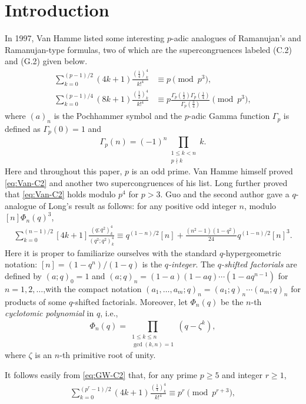\documentclass[12pt]{article}
\numberwithin{equation}{section}
\begin{document}
\section{Introduction}
In 1997, Van Hamme\cite{Van} listed some interesting $p$-adic analogues of Ramanujan's and Ramanujan-type formulas, two of which are the supercongruences 
labeled {\rm (C.2)} and {\rm (G.2)} given below. 
\begin{align}
    \label{eq:Van-C2}\sum_{k=0}^{(p-1)/2}(4k+1)\frac{(\tfrac14)^4_k}{k!^4}&\equiv p\pmod{p^3},\\
    \label{eq:Van-G2}\sum_{k=0}^{(p-1)/4}(8k+1)\frac{(\tfrac12)^4_k}{k!^4}&\equiv p\frac{\Gamma_p(\tfrac12)\Gamma_p(\tfrac14)}{\Gamma_p(\tfrac34)}\pmod{p^3},
\end{align}
where $(a)_n$ is the Pochhammer symbol and the $p$-adic Gamma function $\Gamma_p$ is defined as
$\Gamma_p(0)=1$ and \[\Gamma_p(n)=(-1)^n\prod_{\substack{1\leqslant k < n\\ p\nmid k}}^{}k.\] Here and throughout this paper, $p$ is an odd prime.
Van Hamme\cite{Van} himself proved \eqref{eq:Van-C2} and another two supercongruences of his list.  
Long\cite{Long} further proved that \eqref{eq:Van-C2} holds modulo $p^4$ for $p>3$. Guo and the second author\cite{Guo-Wang-C2} gave a $q$-analogue of Long's result as follows:
for any positive odd integer $n$, modulo ${[n]\Phi_n(q)^3}$,
\begin{align}\label{eq:GW-C2}
    \sum_{k=0}^{(n-1)/2}[4k+1]\frac{(q;q^2)^4_k}{(q^2;q^2)^4_k}\equiv q^{(1-n)/2}[n]+\frac{(n^2-1)(1-q^2)}{24}q^{(1-n)/2}[n]^3 .
\end{align}
Here it is proper to familiarize ourselves with the standard $q$-hypergeometric notation: $[n]=(1-q^n)/(1-q)$ is the {\em $q$-integer}. The {\em $q$-shifted factorials} are defined by $(a;q)_0=1$
and $(a;q)_n=(1-a)(1-aq)\cdots(1-aq^{n-1})$ for $n=1,2,\dots$,with the compact notation $(a_1,\dots,a_m;q)_n=(a_1;q)_n\cdots(a_m;q)_n$ for products of some $q$-shifted factorials.
 Moreover, let $\Phi_n(q)$ be the $n$-th \emph{cyclotomic polynomial} in $q$, i.e.,$$\Phi_n(q)=\prod_{\substack{1\leqslant k \leqslant n\\ \gcd(k,n)=1}}^{}(q-\zeta^k),$$
where $\zeta$ is an $n$-th primitive root of unity. \par 
It follows easily from \eqref{eq:GW-C2} that, for any prime $p\geqslant5$ and integer $r\geqslant1$,
\begin{align}\label{eq:GW-gen}
    \sum_{k=0}^{(p^r-1)/2}(4k+1)\frac{(\tfrac14)^4_k}{k!^4}\equiv p^r \pmod{p^{r+3}},
\end{align} 
\end{document}
